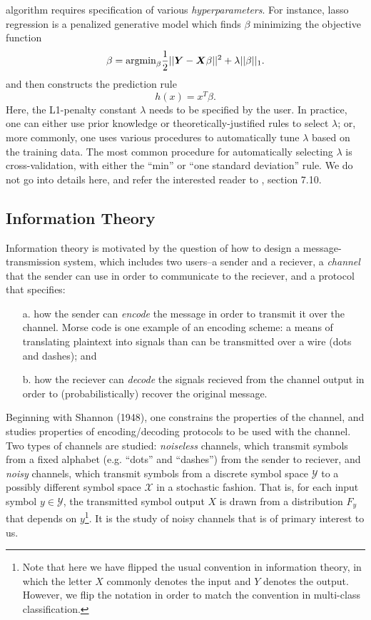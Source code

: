 algorithm requires specification of various \emph{hyperparameters}.
For instance, lasso regression is a penalized generative model which
finds $\beta$ minimizing the objective function
\[
\beta = \text{argmin}_\beta \frac{1}{2}||\boldsymbol{Y} - \boldsymbol{X} \beta||^2 + \lambda ||\beta||_1.
\]
and then constructs the prediction rule
\[
h(x) = x^T \beta.
\]
Here, the L1-penalty constant $\lambda$ needs to be specified by the
user.  In practice, one can either use prior knowledge or
theoretically-justified rules to select $\lambda$; or, more commonly,
one uses various procedures to automatically tune $\lambda$ based on
the training data.  The most common procedure for automatically
selecting $\lambda$ is cross-validation, with either the ``min'' or
``one standard deviation'' rule.  We do not go into details here, and
refer the interested reader to \cite{Hastie2009a}, section 7.10.

\subsection{Information Theory}\label{sec:intro_mi}


Information theory is motivated by the question of how to design a
message-transmission system, which includes two users--a sender and a
reciever, a \emph{channel} that the sender can use in order to
communicate to the reciever, and a protocol that specifies:
\begin{itemize}
\item[a.] how the sender can \emph{encode} the message in order to
  transmit it over the channel.  Morse code is one example of an
  encoding scheme: a means of translating plaintext into signals than
  can be transmitted over a wire (dots and dashes); and
\item[b.] how the reciever can \emph{decode} the signals recieved from
  the channel output in order to (probabilistically) recover the
  original message.
\end{itemize}

Beginning with Shannon (1948), one constrains the properties of the
channel, and studies properties of encoding/decoding protocols to be
used with the channel.  Two types of channels are studied:
\emph{noiseless} channels, which transmit symbols from a fixed
alphabet (e.g. ``dots'' and ``dashes'') from the sender to reciever,
and \emph{noisy} channels, which transmit symbols from a discrete
symbol space $\mathcal{Y}$ to a possibly different symbol space
$\mathcal{X}$ in a stochastic fashion.  That is, for each input symbol
$y \in \mathcal{Y}$, the transmitted symbol output $X$ is drawn from a
distribution $F_y$ that depends on $y$\footnote{Note that here we
  have flipped the usual convention in information theory, in which
  the letter $X$ commonly denotes the input and $Y$ denotes the
  output.  However, we flip the notation in order to match the
  convention in multi-class classification.}.  It is the study of
noisy channels that is of primary interest to us.


